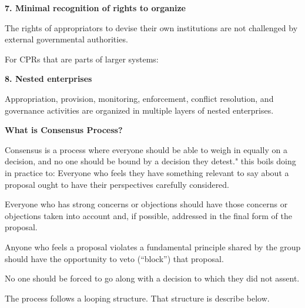 \documentclass{article}
\begin{document}
\textbf{7. Minimal recognition of rights to organize}

The rights of appropriators to devise their own institutions are not challenged by external governmental authorities.

For CPRs that are parts of larger systems:

\vspace{0.2cm}

\textbf{8. Nested enterprises}

Appropriation, provision, monitoring, enforcement, conflict resolution, and governance activities are organized in multiple layers of nested enterprises.





\pagebreak
{\centering \huge \textbf{What is Consensus Process?}\par}


Consensus is a process where everyone should be able to weigh in equally on a decision, and no one should be bound by a decision they detest."
this boils doing in practice to: Everyone who feels they have something relevant to say about a proposal ought to have their perspectives carefully considered.

Everyone who has strong concerns or objections should have those concerns or objections taken into account and, if possible, addressed in the final form of the proposal.

Anyone who feels a proposal violates a fundamental principle shared by the group should have the opportunity to veto (“block”) that proposal.

No one should be forced to go along with a decision to which they did not assent.

\vspace{0.2cm}

The process follows a looping structure. That structure is describe below.
 
\end{document}
